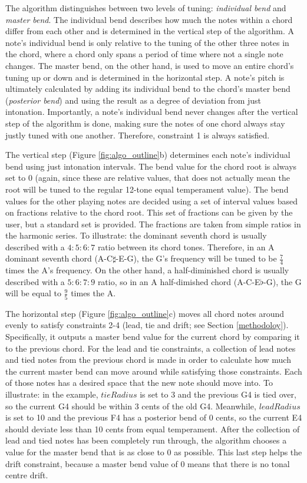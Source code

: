 \documentclass[a4paper]{article}
\begin{document}
The algorithm distinguishes between two levels of tuning: \textit{individual bend} and \textit{master bend}. The individual bend describes how much the notes within a chord differ from each other and is determined in the vertical step of the algorithm. A note's individual bend is only relative to the tuning of the other three notes in the chord, where a chord only spans a period of time where not a single note changes. The master bend, on the other hand, is used to move an entire chord's tuning up or down and is determined in the horizontal step. A note's pitch is ultimately calculated by adding its individual bend to the chord's master bend (\textit{posterior bend}) and using the result as a degree of deviation from just intonation. Importantly, a note's individual bend never changes after the vertical step of the algorithm is done, making sure the notes of one chord always stay justly tuned with one another. Therefore, constraint 1 is always satisfied.

The vertical step (Figure \ref{fig:algo_outline}b) determines each note's individual bend using just intonation intervals. The bend value for the chord root is always set to 0 (again, since these are relative values, that does not actually mean the root will be tuned to the regular 12-tone equal temperament value). The bend values for the other playing notes are decided using a set of interval values based on fractions relative to the chord root. This set of fractions can be given by the user, but a standard set is provided. The fractions are taken from simple ratios in the harmonic series. To illustrate: the dominant seventh chord is usually described with a $4:5:6:7$ ratio between its chord tones. Therefore, in an A dominant seventh chord (A-C$\sharp$-E-G), the G's frequency will be tuned to be $\frac74$ times the A's frequency. On the other hand, a half-diminished chord is usually described with a $5:6:7:9$ ratio, so in an A half-dimished chord (A-C-E$\flat$-G), the G will be equal to $\frac95$ times the A.

The horizontal step (Figure \ref{fig:algo_outline}c) moves all chord notes around evenly to satisfy constraints 2-4 (lead, tie and drift; see Section \ref{methodoloy}). Specifically, it outputs a master bend value for the current chord by comparing it to the previous chord. For the lead and tie constraints, a collection of lead notes and tied notes from the previous chord is made in order to calculate how much the current master bend can move around while satisfying those constraints. Each of those notes has a desired space that the new note should move into. To illustrate: in the example, $\mathit{tieRadius}$ is set to 3 and the previous G4 is tied over, so the current G4 should be within 3 cents of the old G4. Meanwhile, $\mathit{leadRadius}$ is set to 10 and the previous F4 has a posterior bend of 0 cents, so the current E4 should deviate less than 10 cents from equal temperament. After the collection of lead and tied notes has been completely run through, the algorithm chooses a value for the master bend that is as close to 0 as possible. This last step helps the drift constraint, because a master bend value of 0 means that there is no tonal centre drift.
\end{document}
